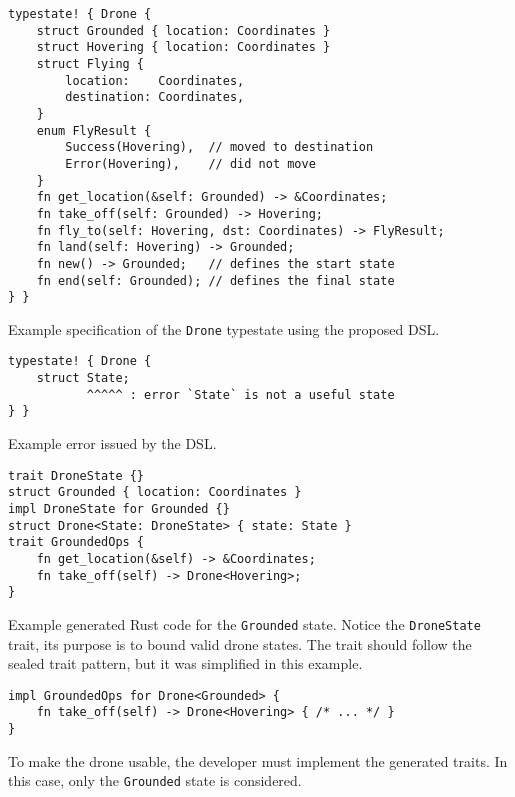 \begin{listing}
    \centering
    \begin{verbatim}
typestate! { Drone {
    struct Grounded { location: Coordinates }
    struct Hovering { location: Coordinates }
    struct Flying {
        location:    Coordinates,
        destination: Coordinates,
    }
    enum FlyResult {
        Success(Hovering),  // moved to destination
        Error(Hovering),    // did not move
    }
    fn get_location(&self: Grounded) -> &Coordinates;
    fn take_off(self: Grounded) -> Hovering;
    fn fly_to(self: Hovering, dst: Coordinates) -> FlyResult;
    fn land(self: Hovering) -> Grounded;
    fn new() -> Grounded;   // defines the start state
    fn end(self: Grounded); // defines the final state
} }
    \end{verbatim}
    \caption{
        Example specification of the \texttt{Drone} typestate using the proposed DSL.
    }
    \label{lst:dsl-typestate-spec}
\end{listing}

\begin{listing}
    \centering
    \begin{verbatim}
typestate! { Drone {
    struct State;
           ^^^^^ : error `State` is not a useful state
} }
    \end{verbatim}
    \caption{
        Example error issued by the DSL.
    }
    \label{lst:dsl-typestate-error}
\end{listing}

\begin{listing}
    \centering
    \begin{verbatim}
trait DroneState {}
struct Grounded { location: Coordinates }
impl DroneState for Grounded {}
struct Drone<State: DroneState> { state: State }
trait GroundedOps {
    fn get_location(&self) -> &Coordinates;
    fn take_off(self) -> Drone<Hovering>;
}
    \end{verbatim}
    \caption{
        Example generated Rust code for the \texttt{Grounded} state.
        Notice the \texttt{DroneState} trait, its purpose is to bound valid drone states.
        The trait should follow the sealed trait pattern, but it was simplified in this example.
    }
    \label{lst:dsl-typestate-generated}
\end{listing}


\begin{listing}
    \centering
    \begin{verbatim}
impl GroundedOps for Drone<Grounded> {
    fn take_off(self) -> Drone<Hovering> { /* ... */ }
}
    \end{verbatim}
    \caption{
        To make the drone usable, the developer must implement the generated traits.
        In this case, only the \texttt{Grounded} state is considered.
    }
    \label{lst:dsl-typestate-impl}
\end{listing}


